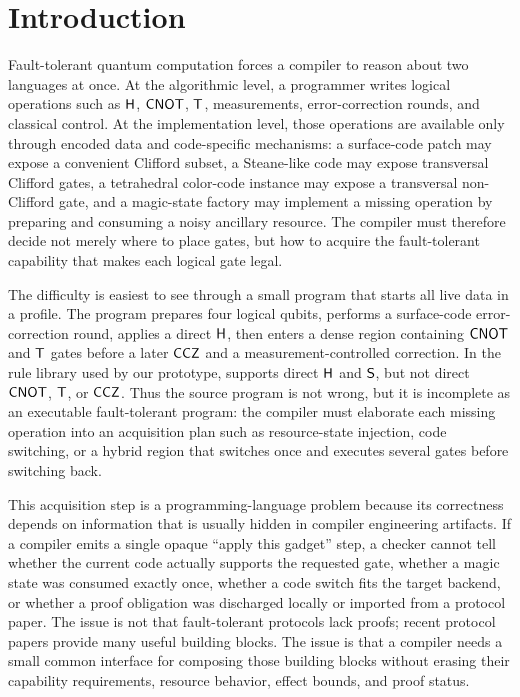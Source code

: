 \section{Introduction}

Fault-tolerant quantum computation forces a compiler to reason about two languages at once.
At the algorithmic level, a programmer writes logical operations such as $\mathsf{H}$, $\mathsf{CNOT}$, $\mathsf{T}$, measurements, error-correction rounds, and classical control.
At the implementation level, those operations are available only through encoded data and code-specific mechanisms: a surface-code patch may expose a convenient Clifford subset, a Steane-like code may expose transversal Clifford gates, a tetrahedral color-code instance may expose a transversal non-Clifford gate, and a magic-state factory may implement a missing operation by preparing and consuming a noisy ancillary resource.
The compiler must therefore decide not merely where to place gates, but how to acquire the fault-tolerant capability that makes each logical gate legal.

The difficulty is easiest to see through a small program that starts all live data in a  profile.
The program prepares four logical qubits, performs a surface-code error-correction round, applies a direct $\mathsf{H}$, then enters a dense region containing $\mathsf{CNOT}$ and $\mathsf{T}$ gates before a later $\mathsf{CCZ}$ and a measurement-controlled correction.
In the rule library used by our prototype,  supports direct $\mathsf{H}$ and $\mathsf{S}$, but not direct $\mathsf{CNOT}$, $\mathsf{T}$, or $\mathsf{CCZ}$.
Thus the source program is not wrong, but it is incomplete as an executable fault-tolerant program: the compiler must elaborate each missing operation into an acquisition plan such as resource-state injection, code switching, or a hybrid region that switches once and executes several gates before switching back.

This acquisition step is a programming-language problem because its correctness depends on information that is usually hidden in compiler engineering artifacts.
If a compiler emits a single opaque ``apply this gadget'' step, a checker cannot tell whether the current code actually supports the requested gate, whether a magic state was consumed exactly once, whether a code switch fits the target backend, or whether a proof obligation was discharged locally or imported from a protocol paper.
The issue is not that fault-tolerant protocols lack proofs; recent protocol papers provide many useful building blocks.
The issue is that a compiler needs a small common interface for composing those building blocks without erasing their capability requirements, resource behavior, effect bounds, and proof status.

